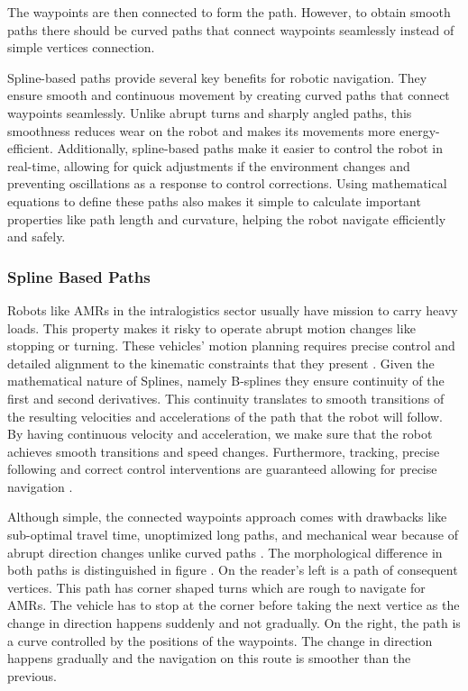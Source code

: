 The waypoints are then connected to form the path.
However, to obtain smooth paths there should be curved paths that connect waypoints seamlessly instead 
of simple vertices connection. 

Spline-based paths provide several key benefits for robotic navigation. They ensure smooth and continuous movement by 
creating curved paths that connect waypoints seamlessly. Unlike abrupt turns and sharply angled paths, this smoothness 
reduces wear on the robot and makes its movements more energy-efficient. Additionally, spline-based paths make it 
easier to control the robot in real-time, allowing for quick adjustments if the environment changes and preventing 
oscillations as a response to control corrections. Using mathematical 
equations to define these paths also makes it simple to calculate important 
properties like path length and curvature, helping the robot navigate efficiently and safely. 

\subsubsection{Spline Based Paths}
Robots like AMRs in the intralogistics sector usually have mission to carry heavy loads. 
This property makes it risky to operate abrupt motion changes like stopping or turning.
These vehicles' motion planning requires precise control and detailed alignment to the 
kinematic constraints that they present \cite{R30}.
Given the mathematical nature of Splines, namely B-splines they ensure continuity of 
the first and second derivatives.
This continuity translates to smooth transitions of the resulting velocities and accelerations of the path
that the robot will follow. By having continuous velocity and acceleration, we make sure that the robot
achieves smooth transitions and speed changes. Furthermore, tracking, precise following and correct control
interventions are guaranteed allowing for precise navigation \cite{R30}. 

 
Although simple,
the connected waypoints approach comes with drawbacks like sub-optimal travel time, unoptimized long paths, 
and mechanical wear because of abrupt direction changes unlike curved paths \cite{R30}. The morphological 
difference in both paths is distinguished in figure . 
On the reader's left is a path of consequent vertices. This path has corner shaped turns which are rough to 
navigate for AMRs. The vehicle has to stop at the corner before taking the next vertice 
as the change in direction happens suddenly and not gradually.
On the right, the path is a curve controlled by the positions of the waypoints. 
The change in direction happens gradually and the navigation on this route is smoother than the previous.

